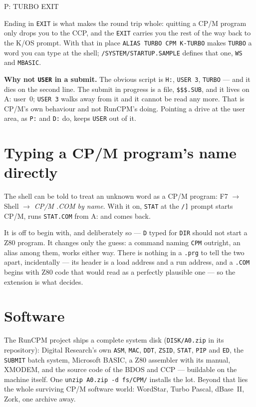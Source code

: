 \begin{type}
P:
TURBO
EXIT
\end{type}

Ending in \verb|EXIT| is what makes the round trip whole: quitting a CP/M
program only drops you to the CCP, and the \verb|EXIT| carries you the
rest of the way back to the K/OS prompt. With that in place
\verb|ALIAS TURBO CPM K-TURBO| makes \verb|TURBO| a word you can type at
the shell; \texttt{/SYSTEM/STARTUP.SAMPLE} defines that one, \verb|WS| and
\verb|MBASIC|.

\begin{aside}
\textbf{Why not \texttt{USER} in a submit.} The obvious script is
\verb|H:|, \verb|USER 3|, \verb|TURBO| --- and it dies on the second line.
The submit in progress is a file, \texttt{\$\$\$.SUB}, and it lives on
A: user~0; \verb|USER 3| walks away from it and it cannot be read any
more. That is CP/M's own behaviour and not RunCPM's doing. Pointing a
drive at the user area, as \verb|P:| and \verb|D:| do, keeps \verb|USER|
out of it.
\end{aside}

\section{Typing a CP/M program's name directly}
The shell can be told to treat an unknown word as a CP/M program: F7
\(\rightarrow\) Shell \(\rightarrow\) \emph{CP/M .COM by name}. With it on,
\verb|STAT| at the \verb|/]| prompt starts CP/M, runs \texttt{STAT.COM}
from A: and comes back.

It is off to begin with, and deliberately so --- \verb|D| typed for
\verb|DIR| should not start a Z80 program. It changes only the guess: a
command naming \verb|CPM| outright, an alias among them, works either way.
There is nothing in a \texttt{.prg} to tell the two apart, incidentally ---
its header is a load address and a run address, and a \texttt{.COM} begins
with Z80 code that would read as a perfectly plausible one --- so the
extension is what decides.

\section{Software}
The RunCPM project ships a complete system disk
(\texttt{DISK/A0.zip} in its repository): Digital Research's own
\texttt{ASM}, \texttt{MAC}, \texttt{DDT}, \texttt{ZSID}, \texttt{STAT},
\texttt{PIP} and \texttt{ED}, the \texttt{SUBMIT} batch system, Microsoft
BASIC, a Z80 assembler with its manual, XMODEM, and the source code of the
BDOS and CCP --- buildable on the machine itself. One
\texttt{unzip A0.zip -d fs/CPM/} installs the lot. Beyond that lies the
whole surviving CP/M software world: WordStar, Turbo Pascal, dBase~II,
Zork, one archive away.

